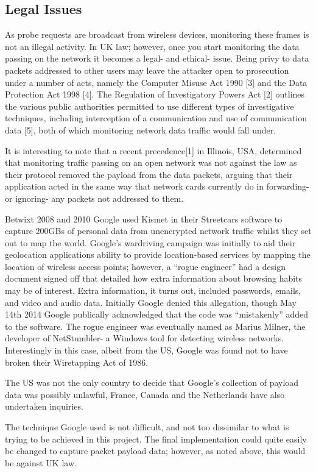 \subsection{Legal Issues}
As probe requests are broadcast from wireless devices, monitoring these frames is not an illegal activity. In UK law; however, once you start monitoring the data passing on the network it becomes a legal- and ethical- issue. Being privy to data packets addressed to other users may leave the attacker open to prosecution under a number of acts, namely the Computer Misuse Act 1990 [3] and the Data Protection Act 1998 [4]. The Regulation of Investigatory Powers Act [2] outlines the various public authorities permitted to use different types of investigative techniques, including interception of a communication and use of communication data [5], both of which monitoring network data traffic would fall under.

It is interesting to note that a recent precedence[1] in Illinois, USA, determined that monitoring traffic passing on an open network was not against the law as their protocol removed the payload from the data packets, arguing that their application acted in the same way that network cards currently do in forwarding- or ignoring- any packets not addressed to them. 

Betwixt 2008 and 2010 Google used Kismet in their Streetcars software to capture 200GBs of personal data from unencrypted network traffic whilst they set out to map the world. Google’s wardriving campaign was initially to aid their geolocation applications ability to provide location-based services by mapping the location of wireless access points; however, a “rogue engineer” had a design document signed off that detailed how extra information about browsing habits may be of interest. Extra information, it turns out, included passwords, emails, and video and audio data. Initially Google denied this allegation, though May 14th 2014 Google publically acknowledged that the code was “mistakenly” added to the software. The rogue engineer was eventually named as Marius Milner, the developer of NetStumbler- a Windows tool for detecting wireless networks. Interestingly in this case, albeit from the US, Google was found not to have broken their Wiretapping Act of 1986.

The US was not the only country to decide that Google’s collection of payload data was possibly unlawful, France, Canada and the Netherlands have also undertaken inquiries.

The technique Google used is not difficult, and not too dissimilar to what is trying to be achieved in this project. The final implementation could quite easily be changed to capture packet payload data; however, as noted above, this would be against UK law.